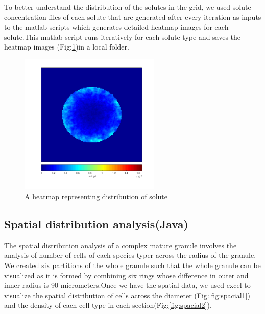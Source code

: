 To better understand the distribution of the solutes in the grid, we used solute concentration files of each solute that are generated after every iteration as inputs to the matlab scripts which generates detailed heatmap images for each solute.This matlab script runs iteratively for each solute type and saves the heatmap images (Fig:\ref{fig:heatmap})in a local folder.


\begin{figure}[htbp]
\centering
\includegraphics[width=0.6\textwidth]{images/Ethanol_solute_640.png}
\caption{A heatmap representing distribution of solute }
\label{fig:heatmap}
\end{figure}


\subsection{Spatial distribution analysis(Java)}

The spatial distribution analysis of a complex mature granule involves the analysis of number of cells of each  species typer across the radius of the granule. We created six partitions of the whole granule such that the whole granule can be visualized as it is formed by combining six rings whose difference in outer and inner radius is 90 micrometers.Once we have the spatial data, we used excel to visualize the spatial distribution of cells across the diameter (Fig:\ref{fig:spacial1}) and the density of each cell type in each section(Fig:\ref{fig:spacial2}).

